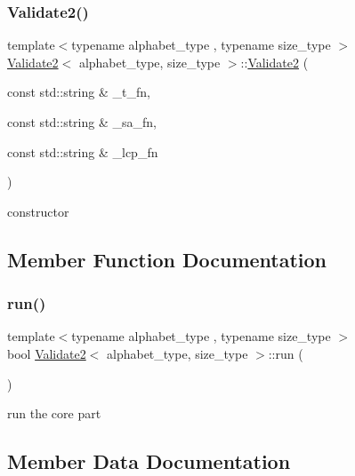 \subsubsection{\texorpdfstring{Validate2()}{Validate2()}}
{\footnotesize\ttfamily template$<$typename alphabet\+\_\+type , typename size\+\_\+type $>$ \\
\hyperlink{class_validate2}{Validate2}$<$ alphabet\+\_\+type, size\+\_\+type $>$\+::\hyperlink{class_validate2}{Validate2} (\begin{DoxyParamCaption}\item[{const std\+::string \&}]{\+\_\+t\+\_\+fn,  }\item[{const std\+::string \&}]{\+\_\+sa\+\_\+fn,  }\item[{const std\+::string \&}]{\+\_\+lcp\+\_\+fn }\end{DoxyParamCaption})\hspace{0.3cm}{\ttfamily [inline]}}



constructor 



\subsection{Member Function Documentation}
\mbox{\label{class_validate2_aa93abe8bbd0bbdaebd1b5a1c5a4c66df}} 
\subsubsection{\texorpdfstring{run()}{run()}}
{\footnotesize\ttfamily template$<$typename alphabet\+\_\+type , typename size\+\_\+type $>$ \\
bool \hyperlink{class_validate2}{Validate2}$<$ alphabet\+\_\+type, size\+\_\+type $>$\+::run (\begin{DoxyParamCaption}{ }\end{DoxyParamCaption})\hspace{0.3cm}{\ttfamily [inline]}}



run the core part 



\subsection{Member Data Documentation}
\mbox{\label{class_validate2_abe354af8e4d3c9d59fe1898ca9ee9b45}} 
